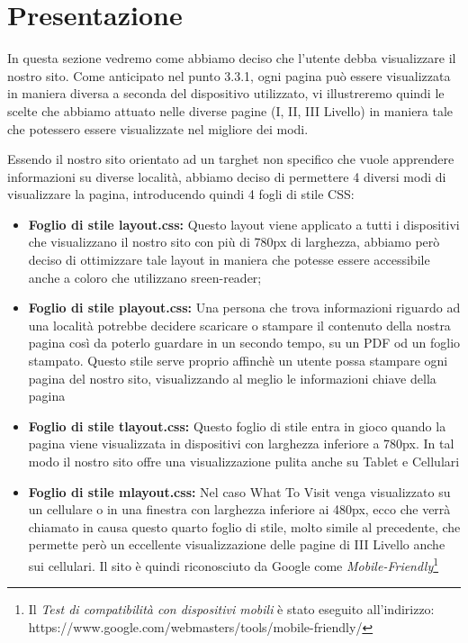 \section{Presentazione}\label{sec:presentazione}
In questa sezione vedremo come abbiamo deciso che l'utente debba visualizzare il nostro sito.
Come anticipato nel punto 3.3.1, ogni pagina può essere visualizzata in maniera diversa a seconda del dispositivo utilizzato, vi illustreremo quindi le scelte che abbiamo attuato nelle diverse pagine (I, II, III Livello) in maniera tale che potessero essere visualizzate nel migliore dei modi.

Essendo il nostro sito orientato ad un targhet non specifico che vuole apprendere informazioni su diverse località, abbiamo deciso di permettere 4 diversi modi di visualizzare la pagina, introducendo quindi 4 fogli di stile CSS:
\begin{itemize}
\item \textbf{Foglio di stile layout.css:} Questo layout viene applicato a tutti i dispositivi che visualizzano il nostro sito con più di 780px di larghezza, abbiamo però deciso di ottimizzare tale layout in maniera che potesse essere accessibile anche a coloro che utilizzano sreen-reader;
\item \textbf{Foglio di stile playout.css:} Una persona che trova informazioni riguardo ad una località potrebbe decidere scaricare o stampare il contenuto della nostra pagina così da poterlo guardare in un secondo tempo, su un PDF od un foglio stampato. Questo stile serve proprio affinchè un utente possa stampare ogni pagina del nostro sito, visualizzando al meglio le informazioni chiave della pagina
\item \textbf{Foglio di stile tlayout.css:} Questo foglio di stile entra in gioco quando la pagina viene visualizzata in dispositivi con larghezza inferiore a 780px. In tal modo il nostro sito offre una visualizzazione pulita anche su Tablet e Cellulari
\item \textbf{Foglio di stile mlayout.css:} Nel caso What To Visit venga visualizzato su un cellulare o in una finestra con larghezza inferiore ai 480px, ecco che verrà chiamato in causa questo quarto foglio di stile, molto simile al precedente, che permette però un eccellente visualizzazione delle pagine di III Livello anche sui cellulari. Il sito è quindi riconosciuto da Google come \textit{Mobile-Friendly}\footnote{Il \textit{Test di compatibilità con dispositivi mobili} è stato eseguito all'indirizzo: https://www.google.com/webmasters/tools/mobile-friendly/}
\end{itemize}

